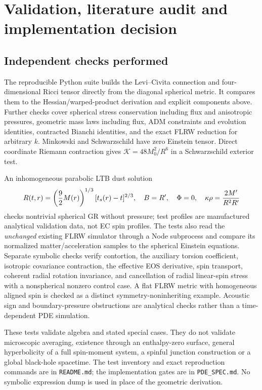 \section{Validation, literature audit and implementation decision}
\subsection{Independent checks performed}
The reproducible Python suite builds the Levi--Civita connection and four-dimensional Ricci tensor directly from the diagonal spherical metric. It compares them to the Hessian/warped-product derivation and explicit components above. Further checks cover spherical stress conservation including flux and anisotropic pressures, geometric mass laws including flux, ADM constraints and evolution identities, contracted Bianchi identities, and the exact FLRW reduction for arbitrary $k$. Minkowski and Schwarzschild have zero Einstein tensor. Direct coordinate Riemann contraction gives $\mathcal K=48M_0^2/R^6$ in a Schwarzschild exterior test.

An inhomogeneous parabolic LTB dust solution
\begin{equation}
 R(t,r)=\left(\frac92M(r)\right)^{1/3}[t_s(r)-t]^{2/3},\quad B=R',\quad\Phi=0,
 \quad\kappa\rho=\frac{2M'}{R^2R'}
\end{equation}
checks nontrivial spherical GR without pressure; test profiles are manufactured analytical validation data, not EC spin profiles. The tests also read the \emph{unchanged} existing FLRW simulator through a Node subprocess and compare its normalized matter/acceleration samples to the spherical Einstein equations. Separate symbolic checks verify contortion, the auxiliary torsion coefficient, isotropic covariance contraction, the effective EOS derivative, spin transport, coherent radial rotation invariance, and cancellation of radial linear-spin stress with a nonspherical nonzero control case. A flat FLRW metric with homogeneous aligned spin is checked as a distinct symmetry-noninheriting example. Acoustic sign and boundary-pressure obstructions are analytical checks rather than a time-dependent PDE simulation.

These tests validate algebra and stated special cases. They do not validate microscopic averaging, existence through an enthalpy-zero surface, general hyperbolicity of a full spin-moment system, a spinful junction construction or a global black-hole spacetime. The test inventory and exact reproduction commands are in \texttt{README.md}; the implementation gates are in \texttt{PDE\_SPEC.md}. No symbolic expression dump is used in place of the geometric derivation.

